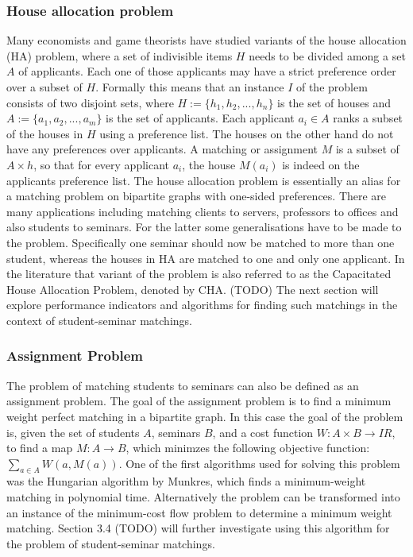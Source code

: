 \subsubsection{House allocation problem}
Many economists and game theorists\cite{FEKETE2003219} have studied variants of the house allocation (HA) problem, where a set of indivisible items $H$ needs to be divided among a set $A$ of applicants. Each one of those applicants may have a strict preference order over a subset of $H$. Formally this means that an instance $I$ of the problem consists of two disjoint sets, where $H := \{h_1, h_2, ..., h_n\}$ is the set of houses and $A := \{a_1, a_2, ..., a_m\}$ is the set of applicants. Each applicant $a_i \in A$ ranks a subset of the houses in $H$ using a preference list. The houses on the other hand do not have any preferences over applicants. A matching or assignment $M$ is a subset of $A \times h$, so that for every applicant $a_i$, the house $M(a_i)$ is indeed on the applicants preference list.\cite{sng-matching} 
\newline
The house allocation problem is essentially an alias for a matching problem on bipartite graphs with one-sided preferences. There are many applications including matching clients to servers, professors to offices and also students to seminars. For the latter some generalisations have to be made to the problem. Specifically one seminar should now be matched to more than one student, whereas the houses in HA are matched to one and only one applicant. In the literature that variant of the problem is also referred to as the Capacitated House Allocation Problem, denoted by CHA.\cite{algorithmics} (TODO) The next section will explore performance indicators and algorithms for finding such matchings in the context of student-seminar matchings.

\subsubsection{Assignment Problem}
The problem of matching students to seminars can also be defined as an assignment problem. The goal of the assignment problem is to find a minimum weight perfect matching in a bipartite graph. In this case the goal of the problem is, given the set of students $A$, seminars $B$, and a cost function $W: A \times B \rightarrow I\!R$, to find a map $M: A \rightarrow B$, which minimzes the following objective function:
$\sum_{a \in A} W(a, M(a))$.
\newline
One of the first algorithms used for solving this problem was the Hungarian algorithm by Munkres, which finds a minimum-weight matching in polynomial time.\cite{Munkres} 
\newline
Alternatively the problem can be transformed into an instance of the minimum-cost flow problem to determine a minimum weight matching. Section 3.4 (TODO) will further investigate using this algorithm for the problem of student-seminar matchings.


